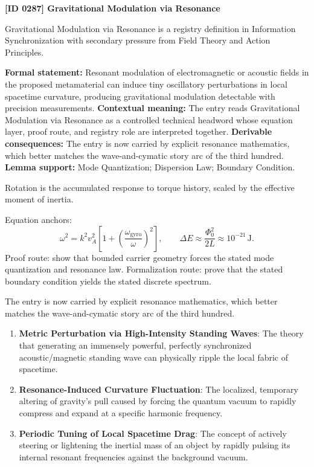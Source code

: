 \clearpage
\noindent\textbf{[ID 0287] Gravitational Modulation via Resonance}\par
\vspace{0.35em}
\begingroup\small
{}
Gravitational Modulation via Resonance is a registry definition in Information Synchronization with secondary pressure from Field Theory and Action Principles.

\begingroup\footnotesize\setlength{\emergencystretch}{3em}\sloppy
\textbf{Formal statement:} Resonant modulation of electromagnetic or acoustic fields in the proposed metamaterial can induce tiny oscillatory perturbations in local spacetime curvature, producing gravitational modulation detectable with precision measurements. \textbf{Contextual meaning:} The entry reads Gravitational Modulation via Resonance as a controlled technical headword whose equation layer, proof route, and registry role are interpreted together. \textbf{Derivable consequences:} The entry is now carried by explicit resonance mathematics, which better matches the wave-and-cymatic story arc of the third hundred. \textbf{Lemma support:} Mode Quantization; Dispersion Law; Boundary Condition.\par
\endgroup

Rotation is the accumulated response to torque history, scaled by the effective moment of inertia.

Equation anchors:
\[
\omega^2=k^2v_A^2\left[1+\left(\frac{\omega_{\mathrm{gyro}}}{\omega}\right)^2\right],
\qquad
\Delta E\approx\frac{\Phi_0^2}{2L}\approx10^{-21}\,\mathrm{J}.
\]
Proof route: show that bounded carrier geometry forces the stated mode quantization and resonance law. Formalization route: prove that the stated boundary condition yields the stated discrete spectrum.

The entry is now carried by explicit resonance mathematics, which better matches the wave-and-cymatic story arc of the third hundred.
\endgroup

\begin{enumerate}[leftmargin=1.6em,itemsep=6pt,topsep=4pt]
\item \textbf{Metric Perturbation via High-Intensity Standing Waves}: The theory that generating an immensely powerful, perfectly synchronized acoustic/magnetic standing wave can physically ripple the local fabric of spacetime.
\item \textbf{Resonance-Induced Curvature Fluctuation}: The localized, temporary altering of gravity's pull caused by forcing the quantum vacuum to rapidly compress and expand at a specific harmonic frequency.
\item \textbf{Periodic Tuning of Local Spacetime Drag}: The concept of actively steering or lightening the inertial mass of an object by rapidly pulsing its internal resonant frequencies against the background vacuum.
\end{enumerate}

